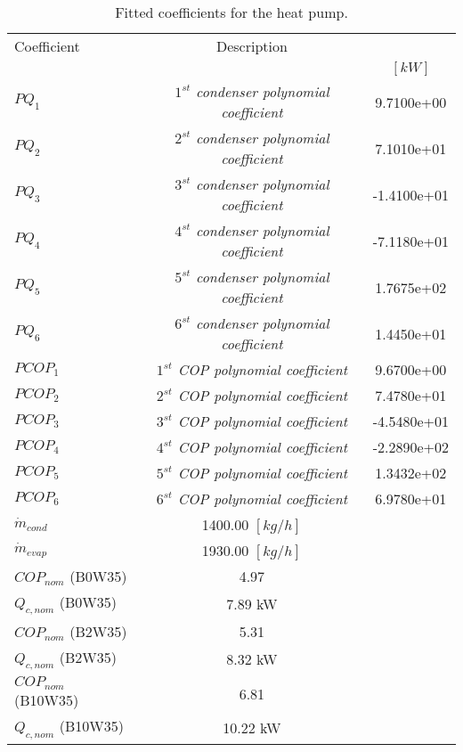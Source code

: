 \documentclass[english]{SPFShortReport}
\author{Dani Carbonell}
\begin{document}
\begin{table}[!ht]
\begin{small}
\caption{Fitted coefficients for the heat pump.}
\begin{center}
\resizebox{12cm}{!} 
{
\begin{tabular}{l | c c } 
\hline
\hline
Coefficient &Description & \\ 
 & &$[kW]$\\ 
\hline
$PQ_{1}$ & \emph{$1^{st}$ condenser polynomial coefficient}  & 9.7100e+00    \\ 
$PQ_{2}$ & \emph{$2^{st}$ condenser polynomial coefficient}  & 7.1010e+01    \\ 
$PQ_{3}$ & \emph{$3^{st}$ condenser polynomial coefficient}  & -1.4100e+01    \\ 
$PQ_{4}$ & \emph{$4^{st}$ condenser polynomial coefficient}  & -7.1180e+01    \\ 
$PQ_{5}$ & \emph{$5^{st}$ condenser polynomial coefficient}  & 1.7675e+02    \\ 
$PQ_{6}$ & \emph{$6^{st}$ condenser polynomial coefficient}  & 1.4450e+01    \\ 
\hline
$PCOP_{1}$ & \emph{$1^{st}$ COP polynomial coefficient}  & 9.6700e+00    \\ 
$PCOP_{2}$ & \emph{$2^{st}$ COP polynomial coefficient}  & 7.4780e+01    \\ 
$PCOP_{3}$ & \emph{$3^{st}$ COP polynomial coefficient}  & -4.5480e+01    \\ 
$PCOP_{4}$ & \emph{$4^{st}$ COP polynomial coefficient}  & -2.2890e+02    \\ 
$PCOP_{5}$ & \emph{$5^{st}$ COP polynomial coefficient}  & 1.3432e+02    \\ 
$PCOP_{6}$ & \emph{$6^{st}$ COP polynomial coefficient}  & 6.9780e+01    \\ 
\hline
$\dot m_{cond}$ & 1400.00 $[kg/h]$\\ 
$\dot m_{evap}$ & 1930.00 $[kg/h]$\\ 
\hline
$COP_{nom}$ (B0W35)& 4.97 \\ 
$Q_{c,nom}$ (B0W35)& 7.89 kW\\ 
$COP_{nom}$ (B2W35)& 5.31 \\ 
$Q_{c,nom}$ (B2W35)& 8.32 kW\\ 
$COP_{nom}$ (B10W35)& 6.81 \\ 
$Q_{c,nom}$ (B10W35)& 10.22 kW\\ 
\hline
\hline
\end{tabular}
}
\label{CoefTable}
\end{center}
\end{small}
\end{table}
\end{document}
